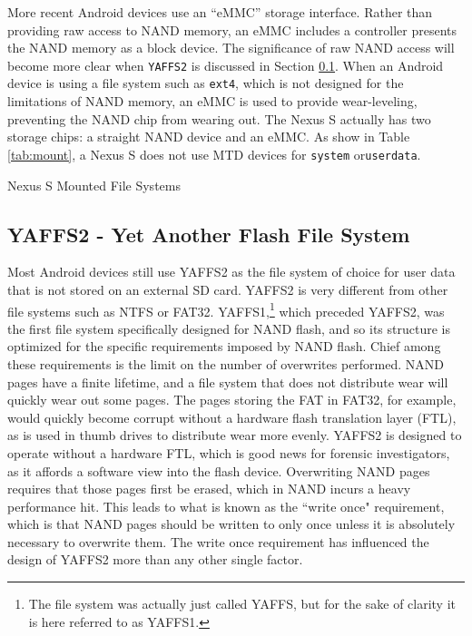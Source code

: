 More recent Android devices use an ``eMMC'' storage interface. Rather than providing raw access to NAND memory, an eMMC includes a
controller presents the NAND memory as a block device. The significance of raw NAND access will become more clear when
\texttt{YAFFS2} is discussed in Section \ref{sec:yaffs2}.  When an Android device is using a file system such as \texttt{ext4},
which is not designed for the limitations of NAND memory, an eMMC is used to provide wear-leveling, preventing the NAND chip from
wearing out.  The Nexus S actually has two storage chips: a straight NAND device and an eMMC. As show in Table \ref{tab:mount}, a
Nexus S does not use MTD devices for \texttt{system} or\texttt{userdata}. 
\begin{table}[htb]
\lstset{numbers=none}

\caption{Nexus S Mounted File Systems}
\label{tab:mount}
\end{table}	

\subsection{YAFFS2 - Yet Another Flash File System} 
\label{sec:yaffs2}
Most Android devices still use YAFFS2 as the file system of choice for user data
that is not stored on an external SD card.  YAFFS2 is very different from other file systems such as NTFS or FAT32.
YAFFS1,\footnote{The file system was actually just called YAFFS, but for the sake of clarity it is here referred to as YAFFS1.} which
preceded YAFFS2,  was the first file system specifically designed for NAND flash, and so its structure is optimized for the specific
requirements imposed by NAND flash.  Chief among these requirements is the limit on the number of overwrites performed.  NAND pages
have a finite lifetime, and a file system that does not distribute wear will quickly wear out some pages.  The pages storing the FAT
in FAT32, for example, would quickly become corrupt without a hardware flash translation layer (FTL), as is used in thumb drives to
distribute wear more evenly.  YAFFS2 is designed to operate without a hardware FTL, which is good news for forensic investigators,
as it affords a software view into the flash device.  Overwriting NAND pages requires that those pages first be erased, which in
NAND incurs a heavy performance hit.  This leads to what is known as the ``write once" requirement, which is that NAND pages should
be written to only once unless it is absolutely necessary to overwrite them. The write once requirement has influenced the design of
YAFFS2 more than any other single factor.

